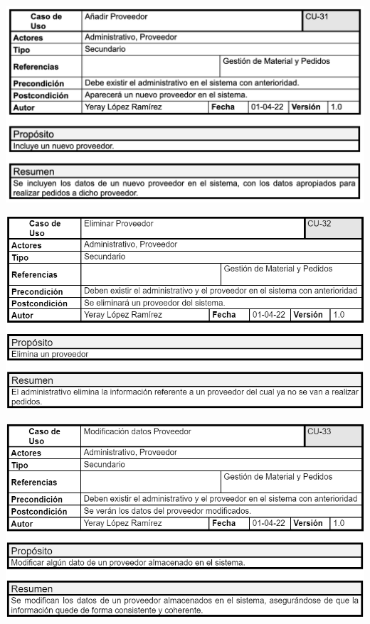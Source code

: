 \documentclass[12pt, spanish]{article}
\begin{document}
\begin{centering}\includegraphics[scale = 0.70]{casos_de_uso/31.png}\\[1.0 cm]\end{centering}
\begin{centering}\includegraphics[scale = 0.62]{casos_de_uso/32.png}\\[1.0 cm]\end{centering}
\begin{centering}\includegraphics[scale = 0.62]{casos_de_uso/33.png}\\[1.0 cm]\end{centering}
\end{document}
